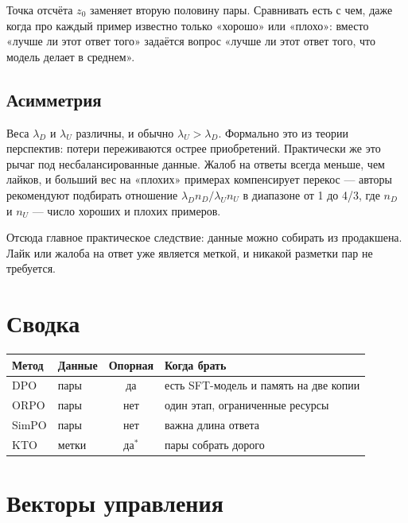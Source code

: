 \documentclass[11pt,a4paper]{article}
\begin{document}
\begin{keybox}
Точка отсчёта $z_0$ заменяет вторую половину пары. Сравнивать есть
с чем, даже когда про каждый пример известно только «хорошо» или
«плохо»: вместо «лучше ли этот ответ того» задаётся вопрос «лучше ли
этот ответ того, что модель делает в среднем».
\end{keybox}

\subsection{Асимметрия}

Веса $\lambda_D$ и $\lambda_U$ различны, и обычно $\lambda_U > \lambda_D$.
Формально это из теории перспектив: потери переживаются острее
приобретений. Практически же это рычаг под несбалансированные данные.
Жалоб на ответы всегда меньше, чем лайков, и больший вес на «плохих»
примерах компенсирует перекос — авторы рекомендуют подбирать отношение
$\lambda_D n_D / \lambda_U n_U$ в диапазоне от 1 до 4/3, где $n_D$
и $n_U$ — число хороших и плохих примеров.

Отсюда главное практическое следствие: данные можно собирать
из продакшена. Лайк или жалоба на ответ уже является меткой, и никакой
разметки пар не требуется.

\section{Сводка}

\begin{center}
\begin{tabular}{@{}llcp{5.0cm}@{}}
\toprule
\textbf{Метод} & \textbf{Данные} & \textbf{Опорная} & \textbf{Когда брать} \\
\midrule
DPO & пары & да & есть SFT-модель и память на две копии \\
ORPO & пары & нет & один этап, ограниченные ресурсы \\
SimPO & пары & нет & важна длина ответа \\
KTO & метки & да$^*$ & пары собрать дорого \\
\bottomrule
\end{tabular}
\end{center}


\section{Векторы управления}
\end{document}
